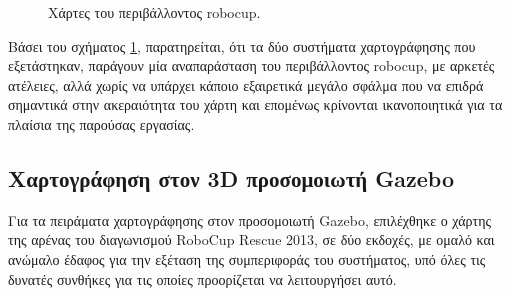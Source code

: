 \begin{figure}[!ht]
	\centering
	\caption{Χάρτες του περιβάλλοντος robocup.}
	\label{fig:stdr_robocup}
\end{figure}

\bigskip
Βάσει του σχήματος \ref{fig:stdr_robocup}, παρατηρείται, ότι τα δύο συστήματα χαρτογράφησης που εξετάστηκαν, παράγουν μία αναπαράσταση του περιβάλλοντος robocup, με αρκετές ατέλειες, αλλά χωρίς να υπάρχει κάποιο εξαιρετικά μεγάλο σφάλμα που να επιδρά σημαντικά στην ακεραιότητα του χάρτη και επομένως κρίνονται ικανοποιητικά για τα πλαίσια της παρούσας εργασίας.

\subsection{Χαρτογράφηση στον 3D προσομοιωτή Gazebo} \label{ssec:gazebo_slam}
Για τα πειράματα χαρτογράφησης στον προσομοιωτή Gazebo, επιλέχθηκε ο χάρτης της αρένας του διαγωνισμού RoboCup Rescue 2013, σε δύο εκδοχές, με ομαλό και ανώμαλο έδαφος για την εξέταση της συμπεριφοράς του συστήματος, υπό όλες τις δυνατές συνθήκες για τις οποίες προορίζεται να λειτουργήσει αυτό.

